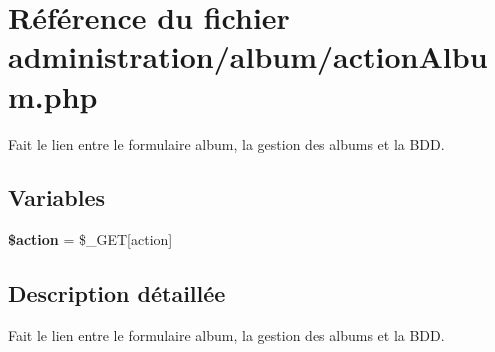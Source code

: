 \hypertarget{actionAlbum_8php}{}\section{Référence du fichier administration/album/action\+Album.php}
\label{actionAlbum_8php}


Fait le lien entre le formulaire album, la gestion des albums et la B\+DD.  


\subsection*{Variables}
\begin{DoxyCompactItemize}
\item 
\mbox{\label{actionAlbum_8php_aa698a3e72116e8e778be0e95d908ee30}} 
{\bfseries \$action} = \$\+\_\+\+G\+ET\mbox{[}\textquotesingle{}action\textquotesingle{}\mbox{]}
\end{DoxyCompactItemize}


\subsection{Description détaillée}
Fait le lien entre le formulaire album, la gestion des albums et la B\+DD. 

